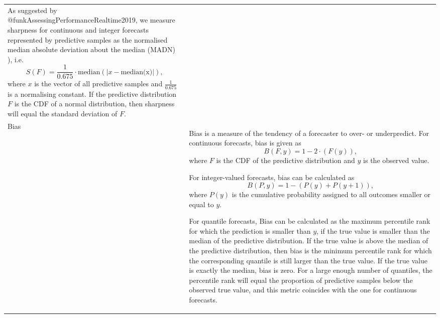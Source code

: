 \documentclass{article}
\begin{document}
\begin{landscape}
\begin{longtable}[t]{>{\raggedright\arraybackslash}p{2.5cm}>{\raggedright\arraybackslash}p{16.5cm}}
As suggested by @funkAssessingPerformanceRealtime2019, we measure sharpness for continuous and integer forecasts represented by predictive samples as the normalised median absolute deviation about the median (MADN) ), i.e. 
$$ S(F) = \frac{1}{0.675} \cdot \text{median}(|x - \text{median(x)}|), $$ 
where $x$ is the vector of all predictive samples and $\frac{1}{0.675}$ is a normalising constant. If the predictive distribution $F$ is the CDF of a normal distribution, then sharpness will equal the standard deviation of $F$. 

\cellcolor{gray!6}{For quantile forecasts we can directly use the sharpness component of the weighted interval score. Sharpness is then simply the weighted mean of the widths of the central prediction intervals.}\\
\addlinespace \addlinespace
Bias & Bias is a measure of the tendency of a forecaster to over- or underpredict. For continuous forecasts, bias is given as 
$$B(F, y) = 1 - 2 \cdot (F (y)), $$ 
where $F$ is the CDF of the predictive distribution and $y$ is the observed value. 

For integer-valued forecasts, bias can be calculated as 
$$B(P, y) = 1 - (P(y) + P(y + 1)), $$ 
where $P(y)$ is the cumulative probability assigned to all outcomes smaller or equal to $y$. 

For quantile forecasts, Bias can be calculated as the maximum percentile rank for which the prediction is smaller than $y$, if the true value is smaller than the median of the predictive distribution. If the true value is above the median of the predictive distribution, then bias is the minimum percentile rank for which the corresponding quantile is still larger than the true value. If the true value is exactly the median, bias is zero. For a large enough number of quantiles, the percentile rank will equal the proportion of predictive samples below the observed true value, and this metric coincides with the one for continuous forecasts.


\end{longtable}
\end{landscape}
\end{document}
